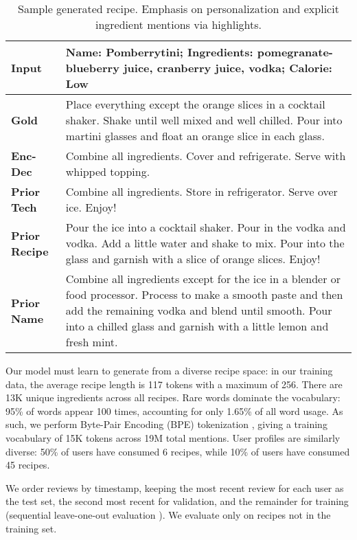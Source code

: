 \documentclass[11pt,a4paper]{article}
\begin{document}
\begin{table*}[h!]
\small
\centering
\begin{tabularx}{\linewidth}{ l X }
\toprule
\bf Input                   & \textbf{Name:} Pomberrytini; \textbf{Ingredients:} pomegranate-blueberry juice, cranberry juice, \colorbox{light-gray}{vodka}; \textbf{Calorie:} Low \\ \midrule
\bf Gold                    & Place everything except the orange slices in a cocktail shaker. Shake until well mixed and well chilled. Pour into martini glasses and float an orange slice in each glass. \\ \midrule
\bf Enc-Dec                 & Combine all ingredients. Cover and refrigerate. Serve with whipped topping.   \\ \midrule
\bf Prior Tech        & Combine all ingredients. Store in refrigerator. Serve over ice. Enjoy!   \\ \midrule
\bf Prior Recipe   & Pour the ice into a cocktail shaker. Pour in the \colorbox{light-gray}{vodka} and vodka. Add a little water and shake to mix. Pour into the glass and garnish with a slice of orange slices. Enjoy!  \\ \midrule
\bf Prior Name     & Combine all ingredients except for the ice in a blender or food processor. Process to make a smooth paste and then add the remaining \colorbox{light-gray}{vodka} and blend until smooth. Pour into a chilled glass and \colorbox{light-gray}{garnish with a little lemon and fresh mint.}
 \\\bottomrule
\end{tabularx}
\caption{Sample generated recipe. Emphasis on personalization and explicit ingredient mentions via \colorbox{light-gray}{highlights.}}
\label{tab:sample_recipes}
\end{table*}
Our model must learn to generate from a diverse recipe space: in our training data, the average recipe length is 117 tokens with a maximum of 256.
There are 13K unique ingredients across all recipes.
Rare words dominate the vocabulary: 95\% of words appear 100 times, accounting for only 1.65\% of all word usage.
As such, we perform Byte-Pair Encoding (BPE) tokenization
\cite{DBLP:conf/acl/SennrichHB16a, radford2018improving}, giving a training vocabulary of 15K tokens across 19M total mentions.
User profiles are similarly diverse: 50\% of users have consumed 6 recipes, while 10\% of users have consumed 45 recipes.

We order reviews by timestamp, keeping the most recent review for each user as the test set, the second most recent for validation, and the remainder for training (sequential leave-one-out evaluation \cite{DBLP:conf/icdm/KangM18}).
We evaluate only on recipes not in the training set.
\end{document}
